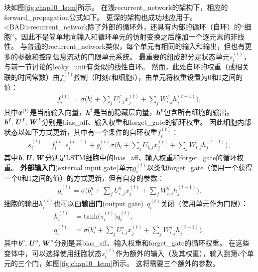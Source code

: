 块如图\ref{fig:chap10_lstm}所示。
在浅\gls{recurrent_network}的架构下，相应的\gls{forward_propagation}公式如下。
更深的架构也成功地应用于\citep{Graves-et-al-ICASSP2013,Pascanu-et-al-ICLR2014}。
<BAD>\gls{recurrent_network}除了外部的循环外，还具有内部的循环（自环）的``细胞''，因此不是简单地向输入和循环单元的仿射变换之后施加一个逐元素的非线性。
与普通的\gls{recurrent_network}类似，每个单元有相同的输入和输出，但也有更多的参数和控制信息流动的门限单元系统。
最重要的组成部分是状态单元$s_i^{(t)}$，与前一节讨论的\gls{leaky_unit}有类似的线性自环。
然而，此处自环的权重（或相关联的时间常数）由$f_i^{(t)}$控制（时刻$t$和细胞$i$），由单元将权重设置为0和1之间的值：
\begin{align}
 f_i^{(t)} = \sigma \Big( b_i^f + \sum_j U_{i,j}^f x_j^{(t)} + \sum_j W_{i,j}^f h_j^{(t-1)} \Big),
\end{align}
其中$\boldsymbol{\mathit{x}}^{(t)}$是当前输入向量，$\boldsymbol{\mathit{h}}^{t}$是当前隐藏层向量，$\boldsymbol{\mathit{h}}^{t}$包含所有细胞的输出。 
$\boldsymbol{\mathit{b}}^f, \boldsymbol{\mathit{U}}^f, \boldsymbol{\mathit{W}}^f$分别是\gls{bias_aff}、输入权重和\gls{forget_gate}的循环权重。
因此细胞内部状态以如下方式更新，其中有一个条件的自环权重$f_i^{(t)}$：
\begin{align}
 s_i^{(t)} = f_i^{(t)}  s_i^{(t-1)} +  g_i^{(t)}
 \sigma \Big( b_i + \sum_j U_{i,j} x_j^{(t)} + \sum_j W_{i,j} h_j^{(t-1)} \Big),
\end{align}
其中$\boldsymbol{\mathit{b}}, \boldsymbol{\mathit{U}}, \boldsymbol{\mathit{W}}$分别是LSTM细胞中的\gls{bias_aff}、输入权重和\gls{forget_gate}的循环权重。
\textbf{外部输入门}(external input gate)单元$g_i^{(t)}$以类似\gls{forget_gate}（使用一个获得一个0和1之间的值）的方式更新，但有自身的参数：
\begin{align}
 g_i^{(t)} = \sigma \Big( b_i^g + \sum_j U_{i,j}^g x_j^{(t)} + \sum_j W_{i,j}^g h_j^{(t-1)} \Big).
\end{align}
细胞的输出$h_i^{(t)}$也可以由\textbf{输出门}(output gate)~$q_i^{(t)}$关闭（使用单元作为门限）：
\begin{align}
 h_i^{(t)} &= \text{tanh}\big( s_i^{(t)} \big) q_i^{(t)}, \\
 q_i^{(t)} &= \sigma \Big( b_i^o + \sum_j U_{i,j}^o x_j^{(t)} + \sum_j W_{i,j}^o h_j^{(t-1)} \Big),
\end{align}
其中$\boldsymbol{\mathit{b}}^o, \boldsymbol{\mathit{U}}^o, \boldsymbol{\mathit{W}}^o$分别是其\gls{bias_aff}、输入权重和\gls{forget_gate}的循环权重。
在这些变体中，可以选择使用细胞状态$s_i^{(t)}$作为额外的输入（及其权重），输入到第$i$个单元的三个门，如图\ref{fig:chap10_lstm}所示。
这将需要三个额外的参数。

